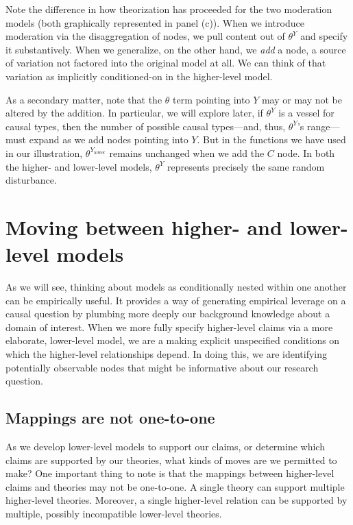 \documentclass[12pt,]{book}
\begin{document}
Note the difference in how theorization has proceeded for the two moderation models (both graphically represented in panel (c)). When we introduce moderation via the disaggregation of nodes, we pull content out of \(\theta^Y\) and specify it substantively. When we generalize, on the other hand, we \emph{add} a node, a source of variation not factored into the original model at all. We can think of that variation as implicitly conditioned-on in the higher-level model.

As a secondary matter, note that the \(\theta\) term pointing into \(Y\) may or may not be altered by the addition. In particular, we will explore later, if \(\theta^Y\) is a vessel for causal types, then the number of possible causal types---and, thus, \(\theta^Y\)'s range---must expand as we add nodes pointing into \(Y\). But in the functions we have used in our illustration, \(\theta^{Y_\text{lower}}\) remains unchanged when we add the \(C\) node. In both the higher- and lower-level models, \(\theta^Y\) represents precisely the same random disturbance.

\hypertarget{moving-between-higher--and-lower-level-models}{%
\section{Moving between higher- and lower-level models}\label{moving-between-higher--and-lower-level-models}}

As we will see, thinking about models as conditionally nested within one another can be empirically useful. It provides a way of generating empirical leverage on a causal question by plumbing more deeply our background knowledge about a domain of interest. When we more fully specify higher-level claims via a more elaborate, lower-level model, we are a making explicit unspecified conditions on which the higher-level relationships depend. In doing this, we are identifying potentially observable nodes that might be informative about our research question.

\hypertarget{mappings-are-not-one-to-one}{%
\subsection{Mappings are not one-to-one}\label{mappings-are-not-one-to-one}}

As we develop lower-level models to support our claims, or determine which claims are supported by our theories, what kinds of moves are we permitted to make? One important thing to note is that the mappings between higher-level claims and theories may not be one-to-one. A single theory can support multiple higher-level theories. Moreover, a single higher-level relation can be supported by multiple, possibly incompatible lower-level theories.
\end{document}
